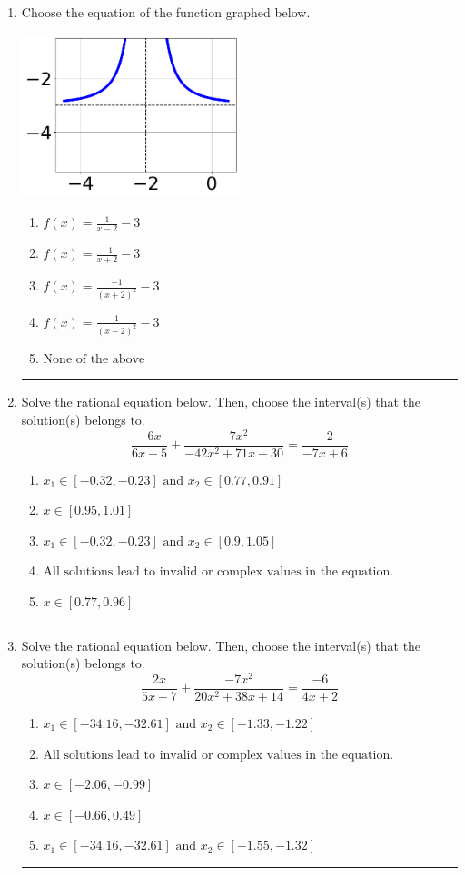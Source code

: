 \documentclass[14pt]{extbook}
\newcommand{\litem}[1]{\item#1\hspace*{-1cm}\rule{\textwidth}{0.4pt}}
\begin{document}
\begin{enumerate}
{\begin{enumerate}[label=\Alph*.]
\end{enumerate} }
\litem{
Choose the equation of the function graphed below.
\begin{center}
    \includegraphics[width=0.5\textwidth]{../Figures/rationalGraphToEquationC.png}
\end{center}
\begin{enumerate}[label=\Alph*.]
\item \( f(x) = \frac{1}{x - 2} - 3 \)
\item \( f(x) = \frac{-1}{x + 2} - 3 \)
\item \( f(x) = \frac{-1}{(x + 2)^2} - 3 \)
\item \( f(x) = \frac{1}{(x - 2)^2} - 3 \)
\item \( \text{None of the above} \)

\end{enumerate} }
\litem{
Solve the rational equation below. Then, choose the interval(s) that the solution(s) belongs to.\[ \frac{-6x}{6x -5} + \frac{-7x^{2}}{-42x^{2} +71 x -30} = \frac{-2}{-7x + 6} \]\begin{enumerate}[label=\Alph*.]
\item \( x_1 \in [-0.32, -0.23] \text{ and } x_2 \in [0.77,0.91] \)
\item \( x \in [0.95,1.01] \)
\item \( x_1 \in [-0.32, -0.23] \text{ and } x_2 \in [0.9,1.05] \)
\item \( \text{All solutions lead to invalid or complex values in the equation.} \)
\item \( x \in [0.77,0.96] \)

\end{enumerate} }
\litem{
Solve the rational equation below. Then, choose the interval(s) that the solution(s) belongs to.\[ \frac{2x}{5x + 7} + \frac{-7x^{2}}{20x^{2} +38 x + 14} = \frac{-6}{4x + 2} \]\begin{enumerate}[label=\Alph*.]
\item \( x_1 \in [-34.16, -32.61] \text{ and } x_2 \in [-1.33,-1.22] \)
\item \( \text{All solutions lead to invalid or complex values in the equation.} \)
\item \( x \in [-2.06,-0.99] \)
\item \( x \in [-0.66,0.49] \)
\item \( x_1 \in [-34.16, -32.61] \text{ and } x_2 \in [-1.55,-1.32] \)


\end{enumerate}}
\end{enumerate}
\end{document}
